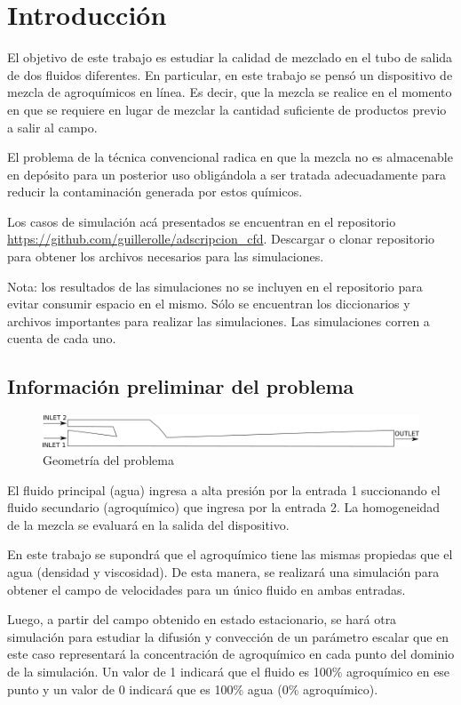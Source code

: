 \documentclass{article}
\begin{document}
\tableofcontents
\newpage

\section{Introducción}
El objetivo de este trabajo es estudiar la calidad de mezclado en el tubo de salida de dos fluidos diferentes. En particular, en este trabajo se pensó un dispositivo de mezcla de agroquímicos en línea. Es decir, que la mezcla se realice en el momento en que se requiere en lugar de mezclar la cantidad suficiente de productos previo a salir al campo. \par
El problema de la técnica convencional radica en que la mezcla no es almacenable en depósito para un posterior uso obligándola a ser tratada adecuadamente para reducir la contaminación generada por estos químicos.\par
Los casos de simulación acá presentados se encuentran en el repositorio  \href{https://github.com/guillerolle/adscripcion_cfd}{https://github.com/guillerolle/adscripcion\_cfd}. Descargar o clonar repositorio para obtener los archivos necesarios para las simulaciones.\par
Nota: los resultados de las simulaciones no se incluyen en el repositorio para evitar consumir espacio en el mismo. Sólo se encuentran los diccionarios y archivos importantes para realizar las simulaciones. Las simulaciones corren a cuenta de cada uno.

\subsection{Información preliminar del problema}

\begin{figure}[h!]
\centering
\includegraphics[width=1\textwidth]{Figuras/01_preliminar.png}
\caption{Geometría del problema}
\label{fig:preliminar}
\end{figure}

El fluido principal (agua) ingresa a alta presión por la entrada 1 succionando el fluido secundario (agroquímico) que ingresa por la entrada 2. La homogeneidad de la mezcla se evaluará en la salida del dispositivo.\par
\bigskip
En este trabajo se supondrá que el agroquímico tiene las mismas propiedas que el agua (densidad y viscosidad). De esta manera, se realizará una simulación para obtener el campo de velocidades para un único fluido en ambas entradas.\par
Luego, a partir del campo obtenido en estado estacionario, se hará otra simulación para estudiar la difusión y convección de un parámetro escalar que en este caso representará la concentración de agroquímico en cada punto del dominio de la simulación. Un valor de 1 indicará que el fluido es 100\% agroquímico en ese punto y un valor de 0 indicará que es 100\% agua (0\% agroquímico).
\end{document}
